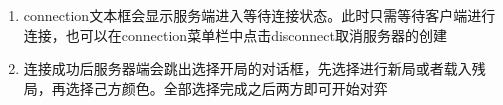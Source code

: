 \documentclass[a4paper,10pt]{article}
\begin{document}
\begin{enumerate}
                                \item connection文本框会显示服务端进入等待连接状态。此时只需等待客户端进行连接，也可以在connection菜单栏中点击disconnect取消服务器的创建
                                \item 连接成功后服务器端会跳出选择开局的对话框，先选择进行新局或者载入残局，再选择己方颜色。全部选择完成之后两方即可开始对弈
                                        \begin{figure}[htbp]
                                                \subfigure[开始对弈]{
}
\end{figure}
\end{enumerate}
\end{document}
